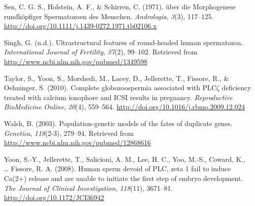 \documentclass[12pt,twoside]{reedthesis}
\theoremstyle{definition}
\theoremstyle{definition}
\theoremstyle{remark}
\begin{document}
  \hypertarget{ref-Sen2009}{}
  Sen, C. G. S., Holstein, A. F., \& Schirren, C. (1971). über die
  Morphogenese rundköpfiger Spermatozoen des Menschen. \emph{Andrologia},
  \emph{3}(3), 117--125.
  \url{http://doi.org/10.1111/j.1439-0272.1971.tb02106.x}
  
  \hypertarget{ref-Singh}{}
  Singh, G. (n.d.). Ultrastructural features of round-headed human
  spermatozoa. \emph{International Journal of Fertility}, \emph{37}(2),
  99--102. Retrieved from \url{http://www.ncbi.nlm.nih.gov/pubmed/1349598}
  
  \hypertarget{ref-Taylor2010}{}
  Taylor, S., Yoon, S., Morshedi, M., Lacey, D., Jellerette, T., Fissore,
  R., \& Oehninger, S. (2010). Complete globozoospermia associated with
  PLC\(\zeta\) deficiency treated with calcium ionophore and ICSI results
  in pregnancy. \emph{Reproductive BioMedicine Online}, \emph{20}(4),
  559--564. \url{http://doi.org/10.1016/j.rbmo.2009.12.024}
  
  \hypertarget{ref-Walsh2003}{}
  Walsh, B. (2003). Population-genetic models of the fates of duplicate
  genes. \emph{Genetica}, \emph{118}(2-3), 279--94. Retrieved from
  \url{http://www.ncbi.nlm.nih.gov/pubmed/12868616}
  
  \hypertarget{ref-Yoon2008}{}
  Yoon, S.-Y., Jellerette, T., Salicioni, A. M., Lee, H. C., Yoo, M.-S.,
  Coward, K., \ldots{} Fissore, R. A. (2008). Human sperm devoid of PLC,
  zeta 1 fail to induce Ca(2+) release and are unable to initiate the
  first step of embryo development. \emph{The Journal of Clinical
  Investigation}, \emph{118}(11), 3671--81.
  \url{http://doi.org/10.1172/JCI36942}


\end{document}
